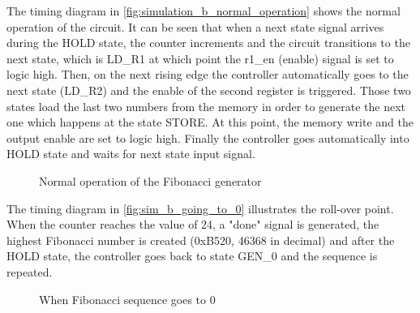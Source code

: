 \documentclass[10pt]{article}
\begin{document}
The timing diagram in \autoref{fig:simulation_b_normal_operation} shows the normal operation of the circuit. 
It can be seen that when a next state signal arrives during the HOLD state, the counter increments and the circuit transitions to the next state, which is LD\_R1 at which point the r1\_en (enable) signal is set to logic high. Then, on the next rising edge the controller automatically goes to the next state (LD\_R2) and the enable of the second register is triggered. Those two states load the last two numbers from the memory in order to generate the next one which happens at the state STORE. At this point, the memory write and the output enable are set to logic high. Finally the controller goes automatically into HOLD state and waits for next state input signal. 
\begin{figure}[ht]
    \centering
    \caption{Normal operation of the Fibonacci generator}
    \label{fig:simulation_b_normal_operation}
\end{figure}
\newpage

The timing diagram in \autoref{fig:sim_b_going_to_0} illustrates the roll-over point. When the counter reaches the value of 24, a "done" signal is generated, the highest Fibonacci number is created (0xB520, 46368 in decimal) and after the HOLD state, the controller goes back to state GEN\_0 and the sequence is repeated. 

\begin{figure}[ht]
    \centering
    \caption{When Fibonacci sequence goes to 0}
    \label{fig:sim_b_going_to_0}
\end{figure}
\end{document}
